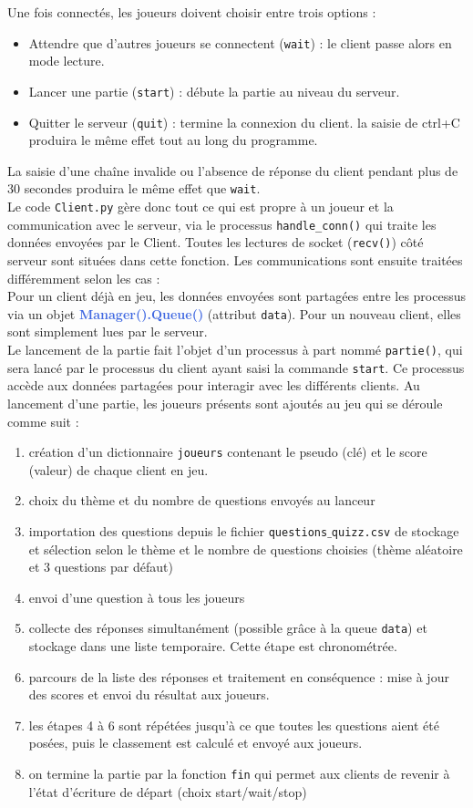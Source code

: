 \documentclass[12pt, a4paper]{article}
\begin{document}
Une fois connectés, les joueurs doivent choisir entre trois options :
\renewcommand{\labelitemi}{\textbullet}
\begin{itemize}
    \item Attendre que d'autres joueurs se connectent (\texttt{wait}) : le client passe alors en mode lecture.
    \item Lancer une partie (\texttt{start}) : débute la partie au niveau du serveur.
    \item Quitter le serveur (\texttt{quit}) : termine la connexion du client. la saisie de ctrl+C produira le même effet tout au long du programme.
\end{itemize}
La saisie d'une chaîne invalide ou l'absence de réponse du client pendant plus de 30 secondes produira le même effet que \texttt{wait}.\\
Le code \texttt{Client.py} gère donc tout ce qui est propre à un joueur et la communication avec le serveur, via le processus \texttt{handle\_conn()} qui traite les données envoyées par le Client. Toutes les lectures de socket (\texttt{recv()}) côté serveur sont situées dans cette fonction. Les communications sont ensuite traitées différemment selon les cas : \\
Pour un client déjà en jeu, les données envoyées sont partagées entre les processus via un objet \textbf{\textcolor{RoyalBlue}{Manager().Queue()}} (attribut \texttt{data}). Pour un nouveau client, elles sont simplement lues par le serveur.\\
Le lancement de la partie fait l'objet d'un processus à part nommé \texttt{partie()}, qui sera lancé par le processus du client ayant saisi la commande \texttt{start}. Ce processus accède aux données partagées pour interagir avec les différents clients. Au lancement d'une partie, les joueurs présents sont ajoutés au jeu qui se déroule comme suit :
\begin{enumerate}
    \item création d'un dictionnaire \texttt{joueurs} contenant le pseudo (clé) et le score (valeur) de chaque client en jeu.
    \item choix du thème et du nombre de questions envoyés au lanceur
    \item importation des questions depuis le fichier \texttt{questions$\_$quizz.csv} de stockage et sélection selon le thème et le nombre de questions choisies (thème aléatoire et 3 questions par défaut)
    \item envoi d'une question à tous les joueurs
    \item collecte des réponses simultanément (possible grâce à la queue \texttt{data}) et stockage dans une liste temporaire. Cette étape est chronométrée.
    \item parcours de la liste des réponses et traitement en conséquence : mise à jour des scores et envoi du résultat aux joueurs.
    \item les étapes 4 à 6 sont répétées jusqu'à ce que toutes les questions aient été posées, puis le classement est calculé et envoyé aux joueurs.
    \item on termine la partie par la fonction \texttt{fin} qui permet aux clients de revenir à l'état d'écriture de départ (choix start/wait/stop)
\end{enumerate}
\end{document}
